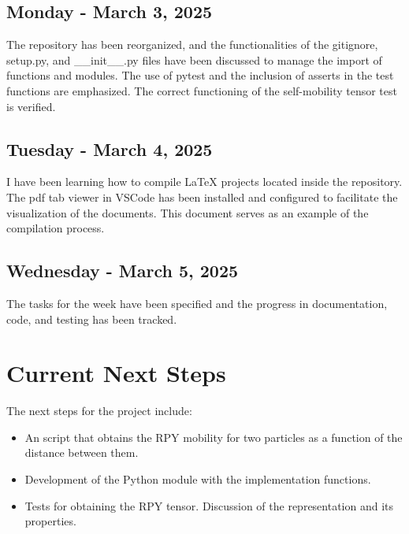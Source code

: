 \documentclass{article}
\begin{document}
\subsection{Monday - March 3, 2025}
The repository has been reorganized, and the functionalities of the gitignore, setup.py, 
and \_\_init\_\_.py files have been discussed to manage the import of functions and modules. 
The use of pytest and the inclusion of asserts in the test functions are emphasized. 
The correct functioning of the self-mobility tensor test is verified.

\subsection{Tuesday - March 4, 2025}
I have been learning how to compile LaTeX projects located inside the repository.
The pdf tab viewer in VSCode has been installed and configured to facilitate the 
visualization of the documents. This document serves as an example of the compilation 
process.

\subsection{Wednesday - March 5, 2025}
The tasks for the week have been specified and the progress in documentation, code, and testing has been tracked.

\section{Current Next Steps}
The next steps for the project include:
\begin{itemize}
    \item An script that obtains the RPY mobility for two particles as a function of the distance between them.
    \item Development of the Python module with the implementation functions.
    \item Tests for obtaining the RPY tensor. Discussion of the representation and its properties.
\end{itemize}
\end{document}
